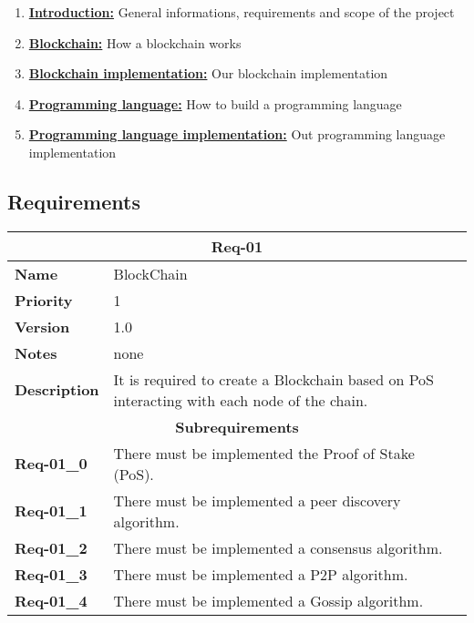 \documentclass[../documentation.tex]{subfiles}
\begin{document}
\begin{enumerate}
    \item \hyperlink{section.1}{\textbf{Introduction:}}
        General informations, requirements and scope of the project
    
    \item \hyperlink{section.2}{\textbf{Blockchain:}}
        How a blockchain works
    
    \item \hyperlink{section.3}{\textbf{Blockchain implementation:}}
        Our blockchain implementation

    \item \hyperlink{section.4}{\textbf{Programming language:}}
        How to build a programming language

    \item \hyperlink{section.5}{\textbf{Programming language implementation:}}
        Out programming language implementation
\end{enumerate}

\pagebreak

\subsection{Requirements} %

\bgroup{}
\def\arraystretch{1.25}
\begin{center}
    \begin{tabular}{ |l|p{9cm}| }
        \hline
        \multicolumn{2}{|c|}{\textbf{Req-01}} \\
        \hline
        \textbf{Name} & BlockChain \\
        \hline
        \textbf{Priority} & 1 \\
        \hline
        \textbf{Version} & 1.0 \\
        \hline
        \textbf{Notes} & none \\
        \hline
        \textbf{Description} & It is required to create a Blockchain based on PoS interacting with each node of the chain. \\
        \hline
        \multicolumn{2}{|c|}{\textbf{Subrequirements}} \\
        \hline
        \textbf{Req-01\_0} & There must be implemented the Proof of Stake (PoS). \\
        \hline
        \textbf{Req-01\_1} & There must be implemented a peer discovery algorithm. \\
        \hline
        \textbf{Req-01\_2} & There must be implemented a consensus algorithm. \\
        \hline
        \textbf{Req-01\_3} & There must be implemented a P2P algorithm. \\
        \hline
        \textbf{Req-01\_4} & There must be implemented a Gossip algorithm. \\
        \hline
    \end{tabular}
\end{center}
\egroup{}
\end{document}
